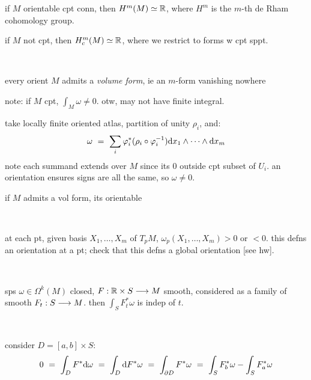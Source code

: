 \begin{crll}
	if $M$ orientable cpt conn, then $H^{m}(M)\simeq\mathbb{R}$, where $H^{m}$ is the
	$m$-th de Rham cohomology group.

	if $M$ not cpt, then $H_{c}^{m}(M)\simeq\mathbb{R}$, where we restrict to forms
	w cpt sppt.
\end{crll} \

\begin{prop}
	every orient $M$ admits a \textit{volume form}, ie an $m$-form vanishing nowhere
\end{prop}
note: if $M$ cpt, $\int_{M}\omega\neq0$.
otw, may not have finite integral.

\begin{pf}
	take locally finite oriented atlas, partition of unity $\rho_{i}$, and:
	\begin{equation*}
		\omega \ = \ \sum_{i}\vphi_{i}^{*}(\rho_{i}\circ\vphi_{i}^{-1})
		\d x_{1}\wedge\cdots\wedge\d x_{m}
	\end{equation*}
	note each summand extends over $M$ since its 0 outside cpt subset of $U_{i}$.
	an orientation ensures signs are all the same, so $\omega\neq0$.
\end{pf}

\newpage
\begin{prop}
	if $M$ admits a vol form, its orientable
\end{prop} \

\begin{pf}
	at each pt, given basis $X_{1},\dots,X_{m}$ of $T_{p}M$,
	$\omega_{p}(X_{1},\dots,X_{m})>0$ or $<0$.
	this defns an orientation at a pt; check that this defns a
	global orientation [see hw].
\end{pf} \

\begin{thm}
	sps $\omega\in\Omega^{k}(M)$ closed, $F:\mathbb{R}\times S\longrightarrow M$ smooth,
	considered as a family of smooth $F_{t}:S\longrightarrow M$.
	then $\int_{S}F_{t}^{*}\omega$ is indep of $t$.
\end{thm} \

\begin{pf}
	consider $D=[a,b]\times S$:
	\begin{equation*}
		0 \ = \ \int_{D}F^{*}\d\omega \ = \ \int_{D}\d F^{*}\omega
		\ = \ \int_{\p D}F^{*}\omega \ = \ \int_{S}F_{b}^{*}\omega-\int_{S}F_{a}^{*}\omega
	\end{equation*}
\end{pf}
